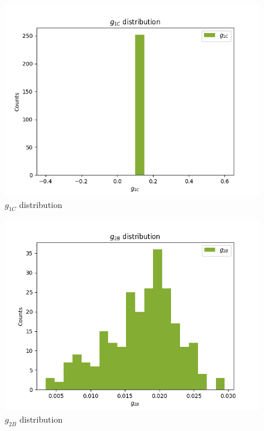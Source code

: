 \documentclass[
]{article}
\begin{document}
\begin{figure}
\centering
\includegraphics{pngplots/param11.png}
\caption{\(g_{1C}\) distribution}
\end{figure}

\begin{figure}
\centering
\includegraphics{pngplots/param12.png}
\caption{\(g_{2B}\) distribution}
\end{figure}
\end{document}
